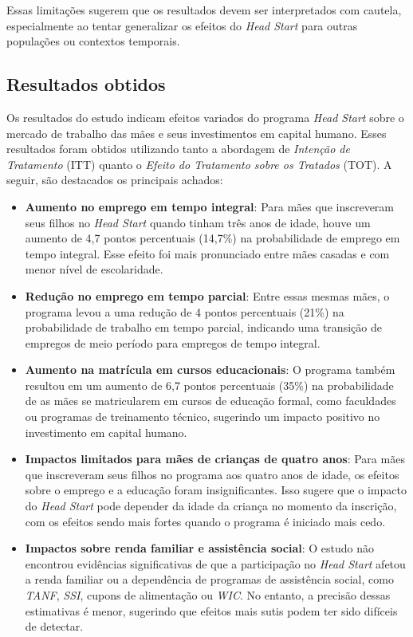 \documentclass[a4paper,12pt]{article}[abntex2]
\begin{document}
Essas limitações sugerem que os resultados devem ser interpretados com cautela, especialmente ao tentar generalizar os efeitos do \textit{Head Start} para outras populações ou contextos temporais.

\subsection{\textbf{Resultados obtidos}}
Os resultados do estudo indicam efeitos variados do programa \textit{Head Start} sobre o mercado de trabalho das mães e seus investimentos em capital humano. Esses resultados foram obtidos utilizando tanto a abordagem de \textit{Intenção de Tratamento} (ITT) quanto o \textit{Efeito do Tratamento sobre os Tratados} (TOT). A seguir, são destacados os principais achados:
\begin{itemize}
    \item \textbf{Aumento no emprego em tempo integral}: Para mães que inscreveram seus filhos no \textit{Head Start} quando tinham três anos de idade, houve um aumento de 4,7 pontos percentuais (14,7\%) na probabilidade de emprego em tempo integral. Esse efeito foi mais pronunciado entre mães casadas e com menor nível de escolaridade.
    
    \item \textbf{Redução no emprego em tempo parcial}: Entre essas mesmas mães, o programa levou a uma redução de 4 pontos percentuais (21\%) na probabilidade de trabalho em tempo parcial, indicando uma transição de empregos de meio período para empregos de tempo integral.
    
    \item \textbf{Aumento na matrícula em cursos educacionais}: O programa também resultou em um aumento de 6,7 pontos percentuais (35\%) na probabilidade de as mães se matricularem em cursos de educação formal, como faculdades ou programas de treinamento técnico, sugerindo um impacto positivo no investimento em capital humano.
    
    \item \textbf{Impactos limitados para mães de crianças de quatro anos}: Para mães que inscreveram seus filhos no programa aos quatro anos de idade, os efeitos sobre o emprego e a educação foram insignificantes. Isso sugere que o impacto do \textit{Head Start} pode depender da idade da criança no momento da inscrição, com os efeitos sendo mais fortes quando o programa é iniciado mais cedo.
    
    \item \textbf{Impactos sobre renda familiar e assistência social}: O estudo não encontrou evidências significativas de que a participação no \textit{Head Start} afetou a renda familiar ou a dependência de programas de assistência social, como \textit{TANF}, \textit{SSI}, cupons de alimentação ou \textit{WIC}. No entanto, a precisão dessas estimativas é menor, sugerindo que efeitos mais sutis podem ter sido difíceis de detectar.
    

\end{itemize}
\end{document}
